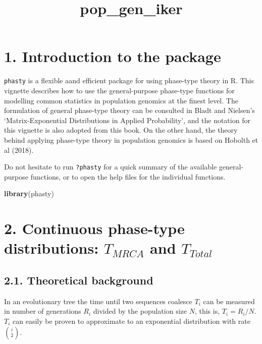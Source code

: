 \documentclass[]{article}
\title{pop\_gen\_iker}
\author{}
\date{\vspace{-2.5em}}
\newenvironment{Shaded}{\begin{snugshade}}{\end{snugshade}}
\newcommand{\KeywordTok}[1]{\textcolor[rgb]{0.13,0.29,0.53}{\textbf{#1}}}
\newcommand{\NormalTok}[1]{#1}
\begin{document}
\maketitle

{
\setcounter{tocdepth}{2}
\tableofcontents
}
\hypertarget{introduction-to-the-package}{%
\section{1. Introduction to the
package}\label{introduction-to-the-package}}

\texttt{phasty} is a flexible aand efficient package for using
phase-type theory in R. This vignette describes how to use the
general-purpose phase-type functions for modelling common statistics in
population genomics at the finest level. The formulation of general
phase-type theory can be consulted in Bladt and Nielsen's
`Matrix-Exponential Distributions in Applied Probability', and the
notation for this vignette is also adopted from this book. On the other
hand, the theory behind applying phase-type theory in population
genomics is based on Hobolth et al (2018).

Do not hesitate to run \texttt{?phasty} for a quick summary of the
available general-purpose functions, or to open the help files for the
individual functions.

\begin{Shaded}
\begin{Highlighting}[]
\KeywordTok{library}\NormalTok{(phasty)}
\end{Highlighting}
\end{Shaded}

\hypertarget{continuous-phase-type-distributions-t_mrca-and-t_total}{%
\section{\texorpdfstring{2. Continuous phase-type distributions:
\(T_{MRCA}\) and
\(T_{Total}\)}{2. Continuous phase-type distributions: T\_\{MRCA\} and T\_\{Total\}}}\label{continuous-phase-type-distributions-t_mrca-and-t_total}}

\hypertarget{theoretical-background}{%
\subsection{2.1. Theoretical background}\label{theoretical-background}}

In an evolutionary tree the time until two sequences coalesce \(T_i\)
can be measured in number of generations \(R_i\) divided by the
population size \(N\), this is, \(T_i=R_i/N\). \(T_i\) can easily be
proven to approximate to an exponential distribution with rate
\(\binom{i}{2}\).
\end{document}
